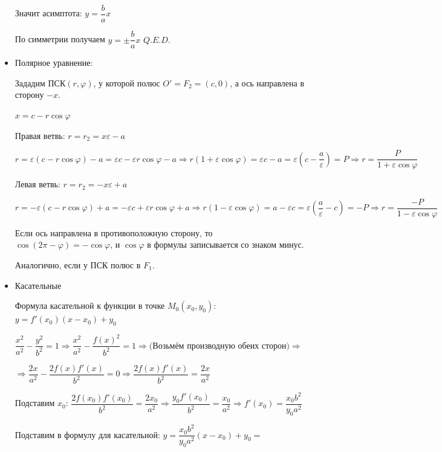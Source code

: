 \documentclass[twoside]{book}
\begin{document}
\begin{itemize}
          Значит асимптота: \(y = \dfrac{b}{a} x\)

          По симметрии получаем \(y = \pm \dfrac{b}{a} x\) \(Q.E.D.\)

    \item Полярное уравнение:

          Зададим ПСК\((r, \varphi)\), у которой полюс \(O'= F_2 = (c, 0)\), а ось направлена в сторону \(-x\).

          \(x = c - r \cos \varphi\)

          Правая ветвь: \(r = r_2 = x \varepsilon - a\)

          \(r = \varepsilon(c - r \cos \varphi) - a = \varepsilon c - \varepsilon r \cos \varphi - a \Rightarrow r(1 + \varepsilon \cos \varphi) = \varepsilon c - a = \varepsilon \left(c - \dfrac{a}{\varepsilon}\right) = P \Rightarrow r = \dfrac{P}{1 + \varepsilon \cos \varphi}\)

          Левая ветвь: \(r = r_2 = - x \varepsilon + a\)

          \(r = - \varepsilon(c - r \cos \varphi) + a = - \varepsilon c + \varepsilon r \cos \varphi + a \Rightarrow r(1 - \varepsilon \cos \varphi) = a - \varepsilon c = \varepsilon \left(\dfrac{a}{\varepsilon} - c\right) = -P \Rightarrow r = \dfrac{-P}{1 - \varepsilon \cos \varphi}\)

          Если ось направлена в противоположную сторону, то \(\cos(2 \pi - \varphi) = - \cos \varphi\), и \(\cos \varphi\) в формулы записывается со знаком минус.

          Аналогично, если у ПСК полюс в \(F_1\).

    \item Касательные

          Формула касательной к функции в точке \(M_0(x_0, y_0)\): \(y = f'(x_0)(x - x_0) + y_0\)

          \(\dfrac{x^2}{a^2} - \dfrac{y^2}{b^2} = 1 \Rightarrow \dfrac{x^2}{a^2} - \dfrac{f(x)^2}{b^2} = 1 \Rightarrow (\)Возьмём производную обеих сторон\() \Rightarrow\)

          \(\Rightarrow \dfrac{2x}{a^2} - \dfrac{2 f(x) f'(x)}{b^2} = 0 \Rightarrow \dfrac{2 f(x) f'(x)}{b^2} = \dfrac{2x}{a^2}\)

          Подставим \(x_0\): \(\dfrac{2 f(x_0) f'(x_0)}{b^2} = \dfrac{2x_0}{a^2} \Rightarrow \dfrac{y_0 f'(x_0)}{b^2} = \dfrac{x_0}{a^2} \Rightarrow f'(x_0) = \dfrac{x_0 b^2}{y_0 a^2}\)

          Подставим в формулу для касательной: \(y = \dfrac{x_0 b^2}{y_0 a^2}(x - x_0) + y_0=\)


\end{itemize}
\end{document}

